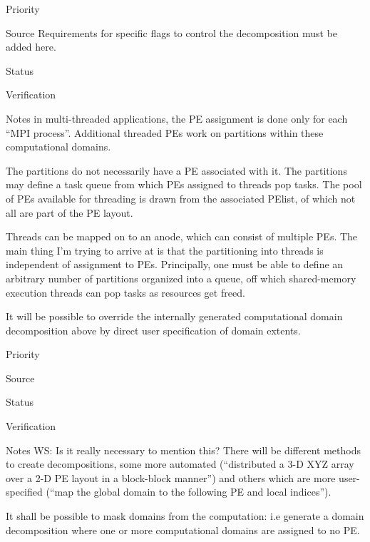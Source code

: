 \begin{reqlist}
\item[Priority]
\item[Source] Requirements for specific flags to control the
  decomposition must be added here.
\item[Status]
\item[Verification]
\item[Notes] in multi-threaded applications, the PE assignment is done
  only for each ``MPI process''. Additional threaded PEs work on
  partitions within these computational domains.
  
  The partitions do not necessarily have a PE associated with it. The
  partitions may define a task queue from which PEs assigned to
  threads pop tasks. The pool of PEs available for threading is drawn
  from the associated PElist, of which not all are part of the PE
  layout.
  
  Threads can be mapped on to an anode, which can consist of multiple
  PEs.  The main thing I'm trying to arrive at is that the
  partitioning into threads is independent of assignment to PEs.
  Principally, one must be able to define an arbitrary number of
  partitions organized into a queue, off which shared-memory execution
  threads can pop tasks as resources get freed.
\end{reqlist}


It will be possible to override the internally generated computational
domain decomposition above by direct user specification of domain
extents.

\begin{reqlist}
\item[Priority]
\item[Source]
\item[Status]
\item[Verification]
\item[Notes]  WS: Is it really necessary to mention this? There will
be different methods to create decompositions, some more automated
(``distributed a 3-D XYZ array over a 2-D PE layout in a block-block
manner'') and others which are more user-specified (``map the global domain
to the following PE and local indices'').

\end{reqlist}

 \label{DG:masklayout}

It shall be possible to mask domains from the computation: i.e
generate a domain decomposition where one or more computational
domains are assigned to no PE.


